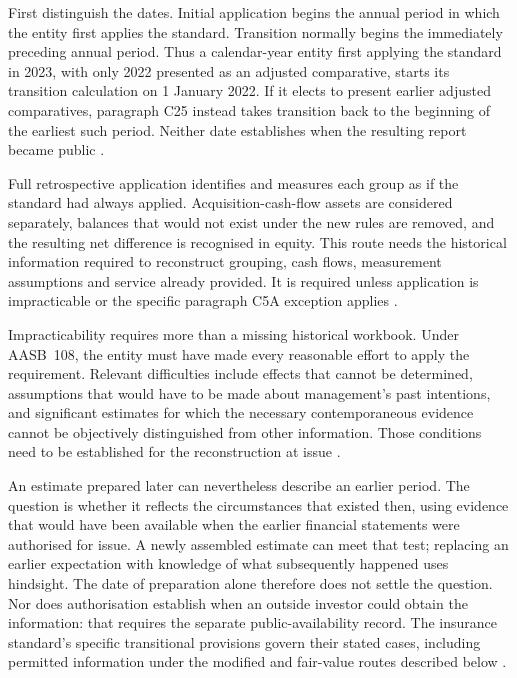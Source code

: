 First distinguish the dates. Initial application begins the annual period in
which the entity first applies the standard. Transition normally begins the
immediately preceding annual period. Thus a calendar-year entity first applying
the standard in 2023, with only 2022 presented as an adjusted comparative,
starts its transition calculation on 1 January 2022. If it elects to present
earlier adjusted comparatives, paragraph C25 instead takes transition back to
the beginning of the earliest such period. Neither date establishes when the
resulting report became public \citep[paragraphs C2 and C25--C27]{aasb17}.

Full retrospective application identifies and measures each group as if the
standard had always applied. Acquisition-cash-flow assets are considered
separately, balances that would not exist under the new rules are removed, and
the resulting net difference is recognised in equity. This route needs the
historical information required to reconstruct grouping, cash flows,
measurement assumptions and service already provided. It is required unless
application is impracticable or the specific paragraph C5A exception applies
\citep[paragraphs C3--C5]{aasb17}.

Impracticability requires more than a missing historical workbook. Under
AASB~108, the entity must have made every reasonable effort to apply the
requirement. Relevant difficulties include effects that cannot be determined,
assumptions that would have to be made about management's past intentions,
and significant estimates for which the necessary contemporaneous evidence
cannot be objectively distinguished from other information. Those conditions
need to be established for the reconstruction at issue
\citep[paragraph~5]{aasb108comp2022}.

An estimate prepared later can nevertheless describe an earlier period. The
question is whether it reflects the circumstances that existed then, using
evidence that would have been available when the earlier financial statements
were authorised for issue. A newly assembled estimate can meet that test;
replacing an earlier expectation with knowledge of what subsequently happened
uses hindsight. The date of preparation alone therefore does not settle the
question. Nor does authorisation establish when an outside investor could
obtain the information: that requires the separate public-availability record.
The insurance standard's specific transitional provisions govern their stated
cases, including permitted information under the modified and fair-value
routes described below
\citep[paragraphs~7, 19(a) and 50--53]{aasb108comp2022}.

